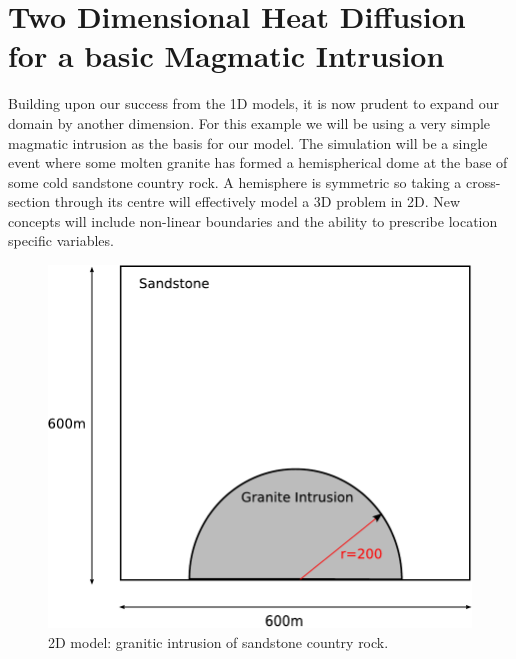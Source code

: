 
%
%
%

\section{Two Dimensional Heat Diffusion for a basic Magmatic Intrusion}
\label{Sec:2DHD}
 Building upon our success from the 1D models, it is now prudent to expand our domain by another dimension. For this example we will be using a very simple magmatic intrusion as the basis for our model. The simulation will be a single event where some molten granite has formed a hemispherical dome at the base of some cold sandstone country rock. A hemisphere is symmetric so taking a cross-section through its centre will effectively model a 3D problem in 2D. New concepts will include non-linear boundaries and the ability to prescribe location specific variables.

\begin{figure}[h!]
\centerline{\includegraphics[width=4.in]{figures/twodheatdiff}}
\caption{2D model: granitic intrusion of sandstone country rock.}
\label{fig:twodhdmodel}
\end{figure}

